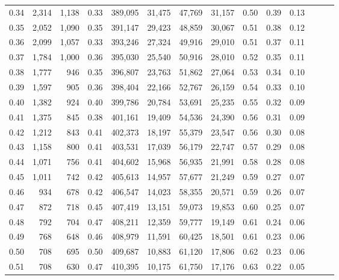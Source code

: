 \begin{tabular}{rrrrrrrrrrrrrr}
0.34 &   2,314 &  1,138 &  0.33 &  389,095 &   31,475 &  47,769 &  31,157 &  0.50 &  0.39 &      0.13 \\
0.35 &   2,052 &  1,090 &  0.35 &  391,147 &   29,423 &  48,859 &  30,067 &  0.51 &  0.38 &      0.12 \\
0.36 &   2,099 &  1,057 &  0.33 &  393,246 &   27,324 &  49,916 &  29,010 &  0.51 &  0.37 &      0.11 \\
0.37 &   1,784 &  1,000 &  0.36 &  395,030 &   25,540 &  50,916 &  28,010 &  0.52 &  0.35 &      0.11 \\
0.38 &   1,777 &    946 &  0.35 &  396,807 &   23,763 &  51,862 &  27,064 &  0.53 &  0.34 &      0.10 \\
0.39 &   1,597 &    905 &  0.36 &  398,404 &   22,166 &  52,767 &  26,159 &  0.54 &  0.33 &      0.10 \\
0.40 &   1,382 &    924 &  0.40 &  399,786 &   20,784 &  53,691 &  25,235 &  0.55 &  0.32 &      0.09 \\
0.41 &   1,375 &    845 &  0.38 &  401,161 &   19,409 &  54,536 &  24,390 &  0.56 &  0.31 &      0.09 \\
0.42 &   1,212 &    843 &  0.41 &  402,373 &   18,197 &  55,379 &  23,547 &  0.56 &  0.30 &      0.08 \\
0.43 &   1,158 &    800 &  0.41 &  403,531 &   17,039 &  56,179 &  22,747 &  0.57 &  0.29 &      0.08 \\
0.44 &   1,071 &    756 &  0.41 &  404,602 &   15,968 &  56,935 &  21,991 &  0.58 &  0.28 &      0.08 \\
0.45 &   1,011 &    742 &  0.42 &  405,613 &   14,957 &  57,677 &  21,249 &  0.59 &  0.27 &      0.07 \\
0.46 &     934 &    678 &  0.42 &  406,547 &   14,023 &  58,355 &  20,571 &  0.59 &  0.26 &      0.07 \\
0.47 &     872 &    718 &  0.45 &  407,419 &   13,151 &  59,073 &  19,853 &  0.60 &  0.25 &      0.07 \\
0.48 &     792 &    704 &  0.47 &  408,211 &   12,359 &  59,777 &  19,149 &  0.61 &  0.24 &      0.06 \\
0.49 &     768 &    648 &  0.46 &  408,979 &   11,591 &  60,425 &  18,501 &  0.61 &  0.23 &      0.06 \\
0.50 &     708 &    695 &  0.50 &  409,687 &   10,883 &  61,120 &  17,806 &  0.62 &  0.23 &      0.06 \\
0.51 &     708 &    630 &  0.47 &  410,395 &   10,175 &  61,750 &  17,176 &  0.63 &  0.22 &      0.05 \\

\end{tabular}
